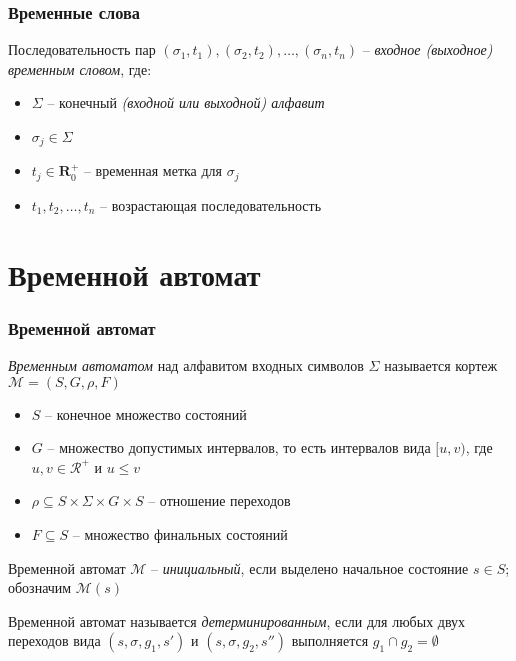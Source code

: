 \documentclass{beamer}
\begin{document}
\begin{frame}
\frametitle{Временные слова}

Последовательность пар $ (\sigma_1, t_1), (\sigma_2, t_2), \dots, (\sigma_n, t_n)$ -- \emph{входное (выходное) временным словом}, где:

\begin{itemize}
	\item $\Sigma$ -- конечный \emph{(входной или выходной) алфавит}
    \item $\sigma_j \in \Sigma$
	\item $t_j \in \mathbf{R}^{+}_0$ -- временная метка для $\sigma_j$
	\item $t_1, t_2, \dots, t_n$ -- возрастающая последовательность
\end{itemize}

\end{frame}



\section{Временной автомат}


\begin{frame}
\frametitle{Временной автомат}

\emph{Временным автоматом} над алфавитом входных символов $\Sigma$ называется кортеж $\mathcal{M} = (S, G, \rho, F)$
	\begin{itemize}
		\item $S$ -- конечное множество состояний
		\item $G$ -- множество допустимых интервалов, то есть интервалов вида $[u, v)$, где $u, v \in \mathcal{R^{+}}$ и $u \leq v$
		\item $\rho \subseteq S \times \Sigma \times G \times S$ -- отношение переходов
		\item $F \subseteq S$ -- множество финальных состояний
	\end{itemize}

Временной автомат $\mathcal{M}$ -- \emph{инициальный}, если выделено начальное состояние $s \in S$; обозначим $\mathcal{M}(s)$
	
Временной автомат называется \emph{детерминированным}, если для любых двух переходов вида $(s, \sigma, g_1, s')$ и $(s, \sigma, g_2, s'')$ выполняется $g_1 \cap g_2 = \emptyset$

\end{frame}
\end{document}
